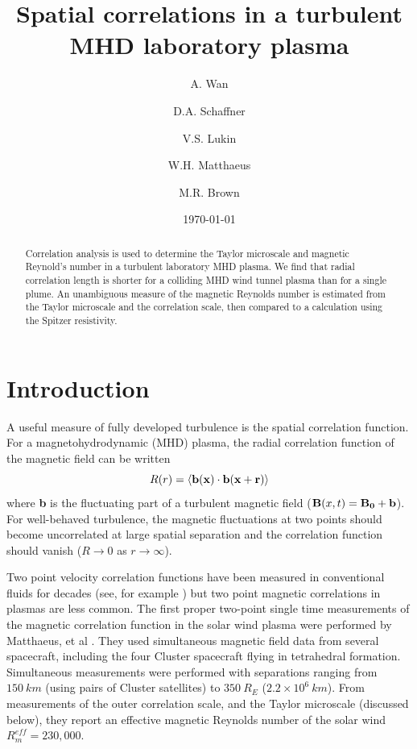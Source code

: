 \documentclass[aip,prl,amsmath,amssymb,reprint,superscriptaddress]{revtex4-1} %
\begin{document}
\title{Spatial correlations in a turbulent MHD laboratory plasma}

\author{A. Wan}
\author{D.A. Schaffner}
\author{V.S. Lukin}
\author{W.H. Matthaeus}
\author{M.R. Brown}
\date{\today}
\begin{abstract}
Correlation analysis is used to determine the Taylor microscale and magnetic Reynold's number in a turbulent laboratory MHD plasma.  We find that radial correlation length is shorter for a colliding MHD wind tunnel plasma than for a single plume.  An unambiguous measure of the magnetic Reynolds number is estimated from the Taylor microscale and the correlation scale, then compared to a calculation using the Spitzer resistivity.
\end{abstract}

\maketitle

\section{Introduction}

A useful measure of fully developed turbulence is the spatial correlation function.  For a magnetohydrodynamic (MHD) plasma, the radial correlation function of the magnetic field can be written
%
\begin{equation}
R(r) =  \langle {\bf b(x) \cdot b(x + r)} \rangle
\label{eq:correlation1}
\end{equation}
%
where {\bf b} is the fluctuating part of a turbulent magnetic field (${\bf B}(x, t) = {\bf B_0 + b}$).  For well-behaved turbulence, the magnetic fluctuations at two points should become uncorrelated at large spatial separation and the correlation function should vanish ($R \rightarrow 0$ as $r \rightarrow \infty$).  

Two point velocity correlation functions have been measured in conventional fluids for decades (see, for example \cite{Belmabrouk98}) but two point magnetic correlations in plasmas are less common.  The first proper two-point single time measurements of the magnetic correlation function in the solar wind plasma were performed by Matthaeus, et al \cite{Matthaeus05}.  They used simultaneous magnetic field data from several spacecraft, including the four Cluster spacecraft flying in tetrahedral formation.  Simultaneous measurements were performed with separations ranging from $150~km$ (using pairs of Cluster satellites) to $350~R_E$ ($2.2 \times 10^6~km$).  From measurements of the outer correlation scale, and the Taylor microscale (discussed below), they report an effective magnetic Reynolds number of the solar wind $R_m^{eff}  = 230,000$.
\end{document}
